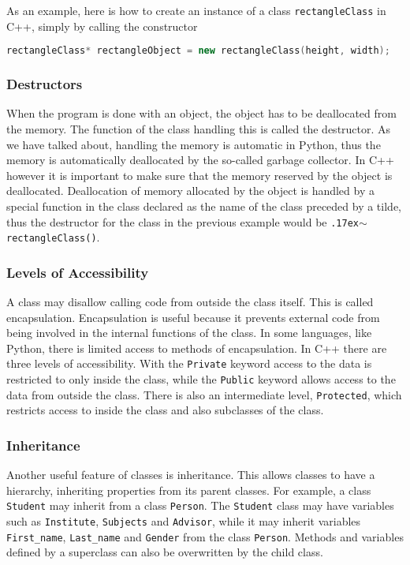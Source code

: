 		As an example, here is how to create an instance of a class {\tt rectangleClass} in C++, simply by calling the constructor
\begin{lstlisting}[language=C++, firstnumber=1, framesep=0pt]
rectangleClass* rectangleObject = new rectangleClass(height, width);
\end{lstlisting}
	
	\subsubsection{Destructors}
		When the program is done with an object, the object has to be deallocated from the memory. The function of the class handling this is called the destructor. As we have talked about, handling the memory is automatic in Python, thus the memory is automatically deallocated by the so-called garbage collector. In C++ however it is important to make sure that the memory reserved by the object is deallocated. Deallocation of memory allocated by the object is handled by a special function in the class declared as the name of the class preceded by a tilde, thus the destructor for the class in the previous example would be {\tt {\raise.17ex\hbox{$\scriptstyle\mathtt{\sim}$}}rectangleClass()}.

	\subsubsection{Levels of Accessibility}
		A class may disallow calling code from outside the class itself. This is called encapsulation. Encapsulation is useful because it prevents external code from being involved in the internal functions of the class. In some languages, like Python, there is limited access to methods of encapsulation. In C++ there are three levels of accessibility. With the {\tt Private} keyword access to the data is restricted to only inside the class, while the {\tt Public} keyword allows access to the data from outside the class. There is also an intermediate level, {\tt Protected}, which restricts access to  inside the class and also subclasses of the class.

	\subsubsection{Inheritance}
		Another useful feature of classes is inheritance. This allows classes to have a hierarchy, inheriting properties from its parent classes. For example, a class {\tt Student} may inherit from a class {\tt Person}. The {\tt Student} class may have variables such as {\tt Institute}, {\tt Subjects} and {\tt Advisor}, while it may inherit variables {\tt First\_name}, {\tt Last\_name} and {\tt Gender} from the class {\tt Person}. Methods and variables defined by a superclass can also be overwritten by the child class.

